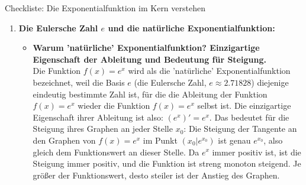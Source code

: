 \begin{loesungsumgebung}{Checkliste: Die Exponentialfunktion im Kern verstehen}

\begin{enumerate}[label=(\alph*)]
    \item \textbf{Die Eulersche Zahl $e$ und die natürliche Exponentialfunktion:}
    \begin{itemize}
        \item \textbf{Warum 'natürliche' Exponentialfunktion? Einzigartige Eigenschaft der Ableitung und Bedeutung für Steigung.} \\
        Die Funktion $f(x)=e^x$ wird als die 'natürliche' Exponentialfunktion bezeichnet, weil die Basis $e$ (die Eulersche Zahl, $e \approx 2.71828$) diejenige eindeutig bestimmte Zahl ist, für die die Ableitung der Funktion $f(x)=e^x$ wieder die Funktion $f(x)=e^x$ selbst ist.
        Die einzigartige Eigenschaft ihrer Ableitung ist also: $(e^x)' = e^x$.
        Das bedeutet für die Steigung ihres Graphen an jeder Stelle $x_0$: Die Steigung der Tangente an den Graphen von $f(x)=e^x$ im Punkt $(x_0|e^{x_0})$ ist genau $e^{x_0}$, also gleich dem Funktionswert an dieser Stelle. Da $e^x$ immer positiv ist, ist die Steigung immer positiv, und die Funktion ist streng monoton steigend. Je größer der Funktionswert, desto steiler ist der Anstieg des Graphen.


\end{itemize}
\end{enumerate}
\end{loesungsumgebung}
